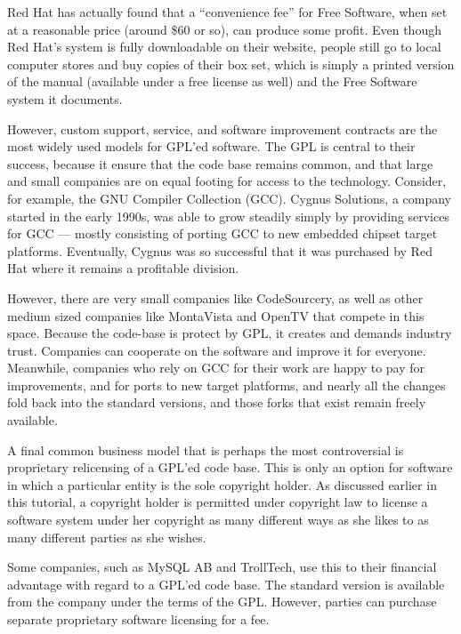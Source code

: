 \documentclass[12pt]{report}
\begin{document}
Red Hat has actually found that a ``convenience fee'' for Free Software,
when set at a reasonable price (around \$60 or so), can produce some
profit.  Even though Red Hat's system is fully downloadable on their
website, people still go to local computer stores and buy copies of their
box set, which is simply a printed version of the manual (available under
a free license as well) and the Free Software system it documents.

\medskip

However, custom support, service, and software improvement contracts are
the most widely used models for GPL'ed software.  The GPL is central to
their success, because it ensure that the code base remains common, and
that large and small companies are on equal footing for access to the
technology.  Consider, for example, the GNU Compiler Collection (GCC).
Cygnus Solutions, a company started in the early 1990s, was able to grow
steadily simply by providing services for GCC --- mostly consisting of
porting GCC to new embedded chipset target platforms.  Eventually, Cygnus
was so successful that it was purchased by Red Hat where it remains a
profitable division.

However, there are very small companies like CodeSourcery, as well as
other medium sized companies like MontaVista and OpenTV that compete in
this space.  Because the code-base is protect by GPL, it creates and
demands industry trust.  Companies can cooperate on the software and
improve it for everyone.  Meanwhile, companies who rely on GCC for their
work are happy to pay for improvements, and for ports to new target
platforms, and nearly all the changes fold back into the standard
versions, and those forks that exist remain freely available.

\medskip

\label{Proprietary Relicensing}

A final common business model that is perhaps the most controversial is
proprietary relicensing of a GPL'ed code base.  This is only an option for
software in which a particular entity is the sole copyright holder.  As
discussed earlier in this tutorial, a copyright holder is permitted under
copyright law to license a software system under her copyright as many
different ways as she likes to as many different parties as she wishes.

Some companies, such as MySQL AB and TrollTech, use this to their
financial advantage with regard to a GPL'ed code base.  The standard
version is available from the company under the terms of the GPL\@.
However, parties can purchase separate proprietary software licensing for
a fee.
\end{document}
